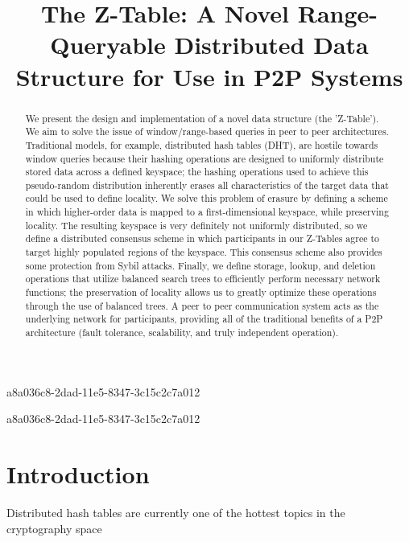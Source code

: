 \documentclass[12pt]{article}
\title{The Z-Table: A Novel Range-Queryable Distributed Data Structure for Use in P2P Systems}
\begin{document}
a8a036c8-2dad-11e5-8347-3c15c2c7a012\maketitle

a8a036c8-2dad-11e5-8347-3c15c2c7a012\begin{abstract}
We present the design and implementation of a novel data structure (the 'Z-Table'). We aim to solve the issue of window/range-based queries in peer to peer architectures. Traditional models, for example,  distributed hash tables (DHT), are hostile towards window queries because their hashing operations are designed to uniformly distribute stored data across a defined keyspace; the hashing operations used to achieve this pseudo-random distribution inherently erases all characteristics of the target data that could be used to define locality. We solve this problem of erasure by defining a scheme in which higher-order data is mapped to a first-dimensional keyspace, while preserving locality. The resulting keyspace is very definitely not uniformly distributed, so we define a distributed consensus scheme in which participants in our Z-Tables agree to target highly populated regions of the keyspace. This consensus scheme also provides some protection from Sybil attacks. Finally, we define storage, lookup, and deletion operations that utilize balanced search trees to efficiently perform necessary network functions; the preservation of locality allows us to greatly optimize these operations through the use of balanced trees. A peer to peer communication system acts as the underlying network for participants, providing all of the traditional benefits of a P2P architecture (fault tolerance, scalability, and truly independent operation).
\end{abstract}


\newpage
\section{Introduction}
Distributed hash tables are currently one of the hottest topics in the cryptography space~\cite{Stoica:2001dj,Rowstron:2001ea,Ratnasamy:2001wn}

\printbibliography
\end{document}
